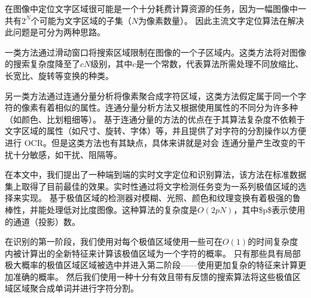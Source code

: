 \documentclass[UTF8]{article}
\begin{document}
在图像中定位文字区域很可能是一个十分耗费计算资源的任务，因为一幅图像中一共有$2^N$个可能为文字区域的子集（$N$为像素数量）。
因此主流文字定位算法在解决此问题是可分为两种思路。

一类方法通过滑动窗口将搜索区域限制在图像的一个子区域内。这类方法将对图像的搜索复杂度降至了$cN$级别，其中$c$是一个常数，代表算法所需处理不同放缩比、长宽比、旋转等变换的种类。

另一类方法通过连通分量分析将像素聚合成字符区域，这类方法假定属于同一个字符的像素有着相似的属性。连通分量分析方法又根据使用属性的不同分为许多种（如颜色、比划粗细等）。
基于连通分量的方法的优点在于其算法复杂度不依赖于文字区域的属性（如尺寸、旋转、字体）等，并且提供了对字符的分割操作以方便进行 OCR。但是这类方法也有其缺点，具体来讲就是对会
连通分量产生改变的干扰十分敏感，如干扰、阻隔等。

在本文中，我们提出了一种端到端的实时文字定位和识别算法，该方法在标准数据集上取得了目前最佳的效果。实时性通过将文字检测任务变为一系列极值区域的选择来实现。
基于极值区域的检测器对模糊、光照、颜色和纹理变换有着极强的鲁棒性，并能处理低对比度图像。这种算法的复杂度是$O(2pN)$，其中\$p\$表示使用的通道（投影）数。


在识别的第一阶段，我们使用对每个极值区域使用一些可在$O(1)$的时间复杂度内被计算出的全新特征来计算该极值区域为一个字符的概率。
只有那些具有局部极大概率的极值区域区域被选中并进入第二阶段——使用更加复杂的特征来计算更加准确的概率。
然后我们使用一种十分有效且带有反馈的搜索算法将这些极值区域区域聚合成单词并进行字符分割。
\end{document}
